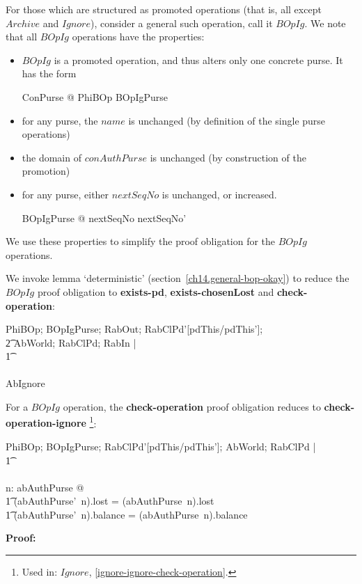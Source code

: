 For those which are structured as promoted operations (that is, all
except $Archive$ and $Ignore$), consider a general such operation,
call it $BOpIg$.  We note that all $BOpIg$ operations have the
properties:
\begin{itemize}
\item $BOpIg$ is a promoted operation, and thus alters only one
  concrete purse.  It has the form
  \begin{gzed}
  \exists \Delta ConPurse @ PhiBOp \land BOpIgPurse
  \end{gzed}
\item for any purse, the $name$ is unchanged (by definition of the
  single purse operations)
\item the domain of $conAuthPurse$ is unchanged (by construction of
  the promotion)
\item for any purse, either $nextSeqNo$ is unchanged, or increased.
  \begin{gzed}
  \forall BOpIgPurse @ nextSeqNo \leq nextSeqNo'
  \end{gzed}
\end{itemize}
We use these properties to simplify the proof obligation for the
$BOpIg$ operations.

We invoke lemma `deterministic' (section~\ref{ch14.general-bop-okay}) to
reduce the $BOpIg$ proof obligation to {\bf exists-pd}, {\bf
  exists-chosenLost} and {\bf check-operation}:
\begin{gzed}
  PhiBOp; BOpIgPurse; RabOut; RabClPd'[pdThis/pdThis'];
  \\ %
  \t2 AbWorld; RabClPd; RabIn  |
  \\ %
  \t1 \pdThisPred \land \chosenLostPred
  \\ %
  \shows
  \\ %
  AbIgnore
\end{gzed}

  {\rm For a $BOpIg$ operation, the {\bf check-operation} proof
    obligation reduces to
    {\bf check-operation-ignore}%
    }%
  \footnote{Used in: $Ignore$, \ref{ignore-ignore-check-operation}.
    }:
  \begin{gzed}
    PhiBOp; BOpIgPurse; RabClPd'[pdThis/pdThis']; AbWorld; RabClPd |
    \\ %
    \t1 \pdThisPred \land \chosenLostPred
    \\ %
    \shows
    \\ %
    \forall n: \dom abAuthPurse @
    \\ %
    \t1 (abAuthPurse'~n).lost = (abAuthPurse~n).lost
    \\ %
    \t1 \land (abAuthPurse'~n).balance = (abAuthPurse~n).balance
  \end{gzed}
{\bf Proof:}

